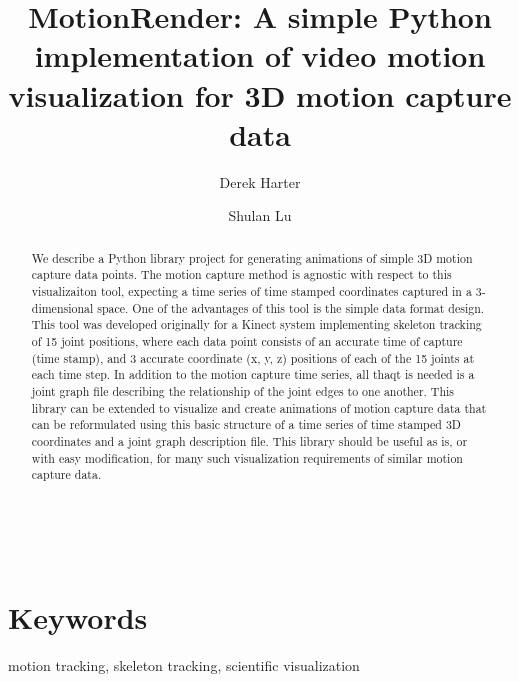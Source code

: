 \documentclass[10pt,a4paper]{article}
\begin{document}
\pagestyle{fancy}

\title{MotionRender: A simple Python implementation of video motion visualization for 3D motion capture data}
\author[1]{Derek Harter}
\author[2]{Shulan Lu}

\maketitle
\thispagestyle{fancy}

\phantom{abstract is indented if this text is missing}
\\
\begin{abstract}

We describe a Python library project for generating animations of
simple 3D motion capture data points.  The motion capture method is
agnostic with respect to this visualizaiton tool, expecting a time
series of time stamped coordinates captured in a 3-dimensional space.
One of the advantages of this tool is the simple data format design.
This tool was developed originally for a Kinect system implementing
skeleton tracking of 15 joint positions, where each data point
consists of an accurate time of capture (time stamp), and 3 accurate
coordinate (x, y, z) positions of each of the 15 joints at each time
step.  In addition to the motion capture time series, all thaqt is
needed is a joint graph file describing the relationship of the joint
edges to one another.  This library can be extended to visualize and
create animations of motion capture data that can be reformulated
using this basic structure of a time series of time stamped 3D
coordinates and a joint graph description file.  This library should
be useful as is, or with easy modification, for many such
visualization requirements of similar motion capture data.
  

\end{abstract}

\section*{\color{f1ROrange}Keywords}

motion tracking, skeleton tracking, scientific visualization

\clearpage
\pagestyle{fancy}
\end{document}

